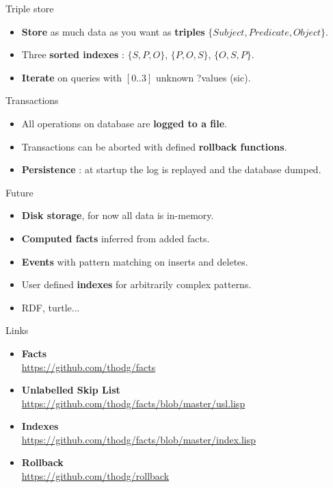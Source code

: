 \documentclass{beamer}
\begin{document}
\begin{frame}
  Triple store
  \begin{itemize}
  \item {\bf Store} as much data as you want as {\bf triples} $\{Subject, Predicate, Object\}$.
  \item Three {\bf sorted indexes} : $\{S, P, O\}$, $\{P, O, S\}$, $\{O, S, P\}$.
  \item {\bf Iterate} on queries with $[0..3]$ unknown ?values (sic).
  \end{itemize}
\end{frame}

\begin{frame}
  Transactions
  \begin{itemize}
  \item All operations on database are {\bf logged to a file}.
  \item Transactions can be aborted with defined {\bf rollback functions}.
  \item {\bf Persistence} : at startup the log is replayed and the database dumped.
  \end{itemize}
\end{frame}

\begin{frame}
  Future
  \begin{itemize}
  \item {\bf Disk storage}, for now all data is in-memory.
  \item {\bf Computed facts} inferred from added facts.
  \item {\bf Events} with pattern matching on inserts and deletes.
  \item User defined {\bf indexes} for arbitrarily complex patterns.
  \item RDF, turtle...
  \end{itemize}
\end{frame}

\begin{frame}
  Links
  \begin{itemize}
  \item {\bf Facts}\\
    \url{https://github.com/thodg/facts}
  \item {\bf Unlabelled Skip List}\\
    \url{https://github.com/thodg/facts/blob/master/usl.lisp}
  \item {\bf Indexes}\\
    \url{https://github.com/thodg/facts/blob/master/index.lisp}
  \item {\bf Rollback}\\
    \url{https://github.com/thodg/rollback}
  \end{itemize}
\end{frame}
\end{document}
